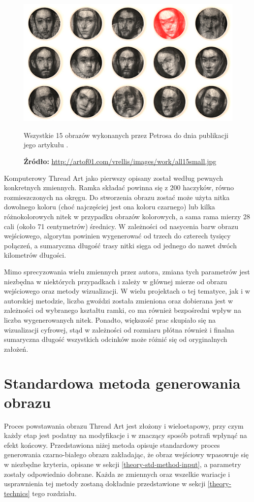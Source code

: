     \begin{figure}[htb]
        \centering
        \includegraphics[width=\textwidth,keepaspectratio]{img/2-theory/petros-art.jpg}
        \caption[Obrazy Petrosa.]{Wszystkie 15 obrazów wykonanych przez Petrosa do dnia publikacji jego artykułu \cite{new-way-to-knit}.}
        \caption*{\footnotesize{\textbf{Źródło:} {\url{http://artof01.com/vrellis/images/work/all15small.jpg}}}}
        \label{theory-all-petros-art}
    \end{figure}
    
    Komputerowy Thread Art jako pierwszy opisany został według pewnych konkretnych zmiennych. Ramka składać powinna się z 200 haczyków, równo rozmieszczonych na okręgu. Do stworzenia obrazu zostać może użyta nitka dowolnego koloru (choć najczęściej jest ona koloru czarnego) lub kilka różnokolorowych nitek w przypadku obrazów kolorowych, a sama rama mierzy 28 cali (około 71 centymetrów) średnicy. W zależności od nasycenia barw obrazu wejściowego, algorytm powinien wygenerować od trzech do czterech tysięcy połączeń, a sumaryczna długość trasy nitki sięga od jednego do nawet dwóch kilometrów długości.
    
    Mimo sprecyzowania wielu zmiennych przez autora, zmiana tych parametrów jest niezbędna w niektórych przypadkach i zależy w głównej mierze od obrazu wejściowego oraz metody wizualizacji. W wielu projektach o tej tematyce, jak i w autorskiej metodzie, liczba gwoździ została zmieniona oraz dobierana jest w zależności od wybranego kształtu ramki, co ma również bezpośredni wpływ na liczba wygenerowanych nitek. Ponadto, większość prac skupiało się na wizualizacji cyfrowej, stąd w zależności od rozmiaru płótna również i finalna sumaryczna długość wszystkich odcinków może różnić się od oryginalnych założeń.
    
    \section{Standardowa metoda generowania obrazu} \label{theory-std-method}
    Proces powstawania obrazu Thread Art jest złożony i wieloetapowy, przy czym każdy etap jest podatny na modyfikacje i w znaczący sposób potrafi wpłynąć na efekt końcowy. Przedstawiona niżej metoda opisuje standardowy proces generowania czarno-białego obrazu zakładając, że obraz wejściowy wpasowuje się w niezbędne kryteria, opisane w sekcji \ref{theory-std-method-input}, a parametry zostały odpowiednio dobrane. Każda ze zmiennych oraz wszelkie wariacje i usprawnienia tej metody zostaną dokładnie przedstawione w sekcji \ref{theory-technics} tego rozdziału.
